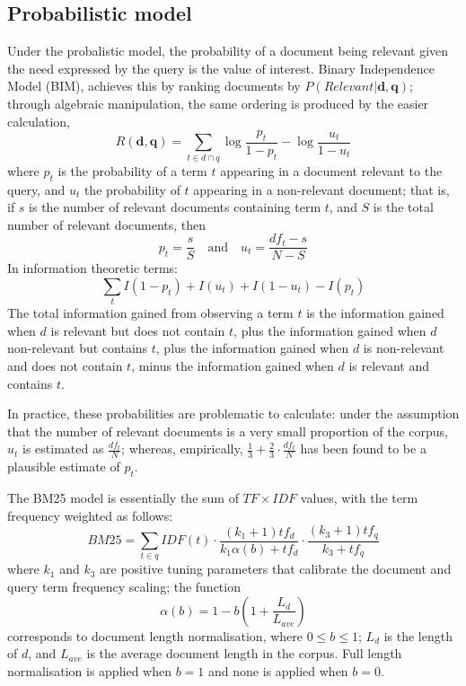 \subsection{Probabilistic model}
Under the probalistic model, the probability of a document being relevant given the need expressed by the query is the value of interest\cite{robertson:1997}. Binary Independence Model (BIM), achieves this by ranking documents by $P(Relevant | \mathbf{d}, \mathbf{q})$; through algebraic manipulation, the same ordering is produced by the easier calculation, 
\begin{equation}
R(\mathbf{d}, \mathbf{q}) = \sum_{t \in d \cap q} \log \frac{p_t}{1 - p_t} - \log\frac{u_t}{1 - u_t}
\end{equation}
where $p_t$ is the probability of a term $t$ appearing in a document relevant to the query, and $u_t$ the probability of $t$ appearing in a non-relevant document; that is, if $s$ is the number of relevant documents containing term $t$, and $S$ is the total number of relevant documents, then \begin{equation}
p_t = \frac{s}{S} \quad\text{and}\quad
u_t = \frac{df_t - s}{N - S}
\end{equation}  
In information theoretic terms:
\begin{equation}
\sum_t I(1 - p_t) + I(u_t) + I(1 - u_t) - I(p_t)
\end{equation}
The total information gained from observing a term $t$ is the information gained when $d$ is relevant but does not contain $t$, plus the information gained when $d$ non-relevant but contains $t$, plus the information gained when $d$ is non-relevant and does not contain $t$, minus the information gained when $d$ is relevant and contains $t$. 

In practice, these probabilities are problematic to calculate: under the assumption that the number of relevant documents is a very small proportion of the corpus, $u_t$ is estimated as $\frac{df_t}{N}$; whereas, empirically, $\frac{1}{3} + \frac{2}{3}\cdot\frac{df_t}{N}$ has been found to be a plausible estimate of $p_t$.  

The BM25 model \cite{robertson:1994} is essentially the sum of $TF \times IDF$ values, with the term frequency weighted as follows: 
\begin{equation}
BM25 = \sum_{t \in q} IDF(t) \cdot \frac{(k_1 + 1) tf_d}{k_1\alpha(b) + tf_d}\cdot \frac{(k_3 + 1)tf_q}{k_3 + tf_q} 
\end{equation}
where $k_1$ and $k_3$ are positive tuning parameters that calibrate the document and query term frequency scaling; the function
\begin{equation}
 \alpha(b) = 1 - b(1 + \frac{L_d}{L_{ave}})
\end{equation}
corresponds to document length normalisation, where $0 \leq b \leq 1$; $L_d$ is the length of $d$, and $L_{ave}$ is the average document length in the corpus. Full length normalisation is applied when $b = 1$ and none is applied when $b = 0$. 
